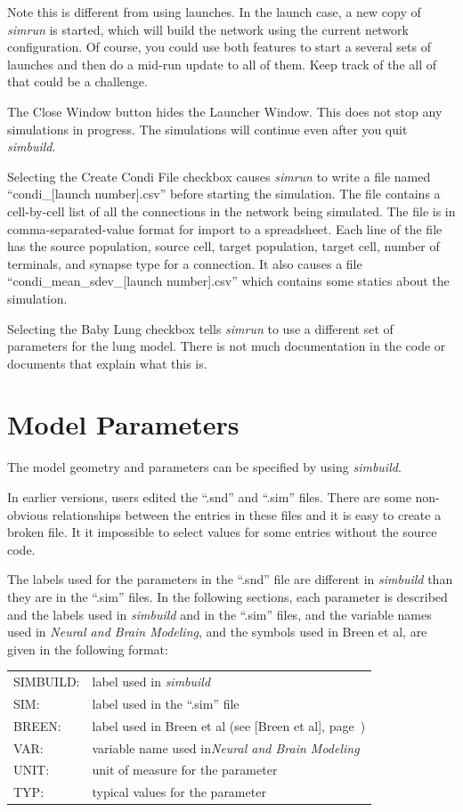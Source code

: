 \documentclass[12pt,openany,oneside]{book}
\newcommand{\ticite}[1]{\textit{#1}}
\newcommand{\tipxref}[1]{see [#1], page~\pageref{#1}}
\newcommand{\prog}[1]{\textit{{#1}}}
\newcommand{\ext}[1]{{{``.#1''}}}
\newcommand{\inquotes}[1]{{{``#1''}}}
\begin{document}
Note this is different from using launches. In the launch case, a new copy
of \prog{simrun} is started, which will build the network using the
current network configuration. Of course, you could use both features to
start a several sets of launches and then do a mid-run update to all of
them. Keep track of the all of that could be a challenge.

The Close Window button hides the Launcher Window.  This does not stop any
simulations in progress. The simulations will continue even after
you quit \prog{simbuild}.

Selecting the Create Condi File checkbox causes \prog{simrun} to write a
file named \inquotes{condi\_[launch number].csv} before starting the
simulation. The file contains a cell-by-cell list of all the connections
in the network being simulated. The file is in comma-separated-value
format for import to a spreadsheet. Each line of the file has the source
population, source cell, target population, target cell, number of
terminals, and synapse type for a connection.  It also causes a file
\inquotes{condi\_mean\_sdev\_[launch number].csv} which contains some
statics about the simulation.

Selecting the Baby Lung checkbox tells \prog{simrun} to use a different
set of parameters for the lung model. There is not much documentation in
the code or documents that explain what this is.

\clearpage
\section{Model Parameters}
\label{Parameters}
The model geometry and parameters can be specified by using 
\prog{simbuild}. 

In earlier versions, users edited the \ext{snd} and \ext{sim} files. There
are some non-obvious relationships between the entries in these files and
it is easy to create a broken file. It it impossible to select values
for some entries without the source code.

The labels used for the parameters in the \ext{snd} file are different in 
\prog{simbuild} than they are in the \ext{sim} files. In the following sections, each
parameter is described and the labels used in \prog{simbuild} and in the
\ext{sim} files, and the variable names used in \ticite{Neural and Brain
Modeling}, and the symbols used in Breen et al, are given in the following format:

\begin{flushleft}
\begin{tabular}{@{}ll@{}}
SIMBUILD:  &  label used in \prog{simbuild}\\
SIM:  &  label used in the \ext{sim} file\\
BREEN: & label used in Breen et al (\tipxref{Breen et al})\\
VAR:  &  variable name used in{\ticite{Neural and Brain Modeling}}\\
UNIT:  &  unit of measure for the parameter\\
TYP:  &  typical values for the parameter\\
\end{tabular}
\end{flushleft}
\end{document}

